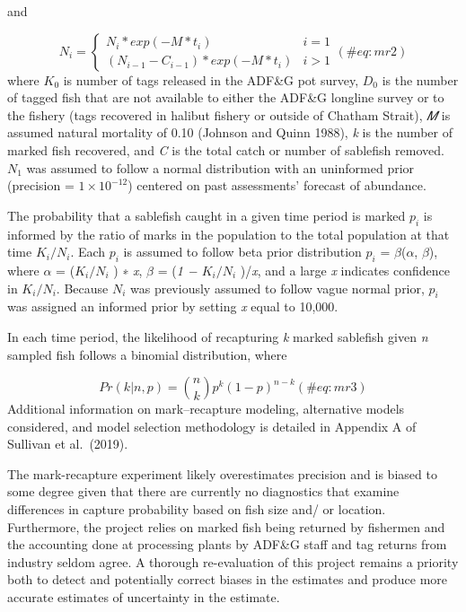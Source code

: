 \documentclass[
]{article}
\begin{document}
and

\[
\begin{equation}
N_{i} = \left\{ \begin{array}{ll}
N_i *exp(-M*t_i) &i = 1\\
(N_{i-1} - C_{i-1})*exp(-M*t_i) & i > 1
\end{array}\right.
(\#eq:mr2)
\end{equation}
\] where \(K_0\) is number of tags released in the ADF\&G pot survey,
\(D_0\) is the number of tagged fish that are not available to either
the ADF\&G longline survey or to the fishery (tags recovered in halibut
fishery or outside of Chatham Strait), \emph{𝑀} is assumed natural
mortality of 0.10 (Johnson and Quinn 1988), \emph{k} is the number of
marked fish recovered, and \emph{C} is the total catch or number of
sablefish removed. \(N_1\) was assumed to follow a normal distribution
with an uninformed prior (precision = \(1×10^{-12}\)) centered on past
assessments' forecast of abundance.

The probability that a sablefish caught in a given time period is marked
\(p_i\) is informed by the ratio of marks in the population to the total
population at that time \(K_i/N_i\). Each \(p_i\) is assumed to follow
beta prior distribution \(p_i\) = \(\beta\)(\(\alpha\), \(\beta\)),
where \(\alpha\) = (\(K_i/N_i\) ) ∗ \emph{x}, \(\beta\) = (\emph{1 −
\(K_i/N_i\) })/\emph{x}, and a large \emph{x} indicates confidence in
\(K_i/N_i\). Because \(N_i\) was previously assumed to follow vague
normal prior, \(p_i\) was assigned an informed prior by setting \emph{x}
equal to 10,000.

In each time period, the likelihood of recapturing \emph{k} marked
sablefish given \emph{n} sampled fish follows a binomial distribution,
where

\[
\begin{equation}
Pr(k|n,p) = {n \choose k}p^k(1-p)^{n-k}
(\#eq:mr3)
\end{equation}
\] Additional information on mark--recapture modeling, alternative
models considered, and model selection methodology is detailed in
Appendix A of Sullivan et al.~(2019).

The mark-recapture experiment likely overestimates precision and is
biased to some degree given that there are currently no diagnostics that
examine differences in capture probability based on fish size and/ or
location. Furthermore, the project relies on marked fish being returned
by fishermen and the accounting done at processing plants by ADF\&G
staff and tag returns from industry seldom agree. A thorough
re-evaluation of this project remains a priority both to detect and
potentially correct biases in the estimates and produce more accurate
estimates of uncertainty in the estimate.
\end{document}
